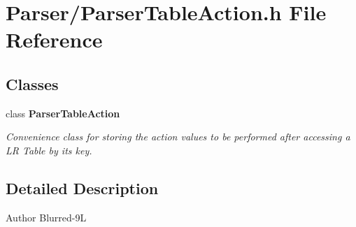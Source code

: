 \section{Parser/\-Parser\-Table\-Action.h File Reference}
\label{_parser_table_action_8h}
\subsection*{Classes}
\begin{DoxyCompactItemize}
\item 
class {\bf Parser\-Table\-Action}
\begin{DoxyCompactList}\small\item\em Convenience class for storing the action values to be performed after accessing a L\-R Table by its key. \end{DoxyCompactList}\end{DoxyCompactItemize}


\subsection{Detailed Description}
\begin{DoxyAuthor}{Author}
Blurred-\/9\-L 
\end{DoxyAuthor}
